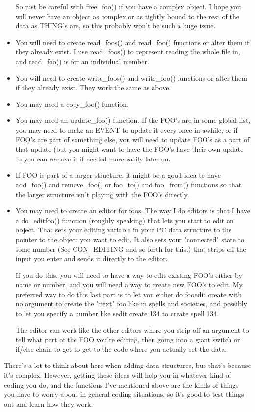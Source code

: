 \begin{itemize}
So just be careful with free\_foo() if you have a complex object.
I hope you will never have an object as complex or as tightly bound
to the rest of the data as THING's are, so this probably won't
be such a huge issue.

\item You will need to create read\_foos() and read\_foo() functions
or alter them if they already exist. I use read\_foos() to represent
reading the whole file in, and read\_foo() is for an individual
member.

\item You will need to create write\_foos() and write\_foo() functions
or alter them if they already exist. They work the same as above.

\item You may need a copy\_foo() function.

\item You may need an update\_foo() function. If the FOO's are in 
some global list, you may need to make an EVENT to update it
every once in awhile, or if FOO's are part of something else,
you will need to update FOO's as a part of that update (but
you might want to have the FOO's have their own update so you
can remove it if needed more easily later on.

\item If FOO is part of a larger structure, it might be a good idea
to have add\_foo() and remove\_foo() or foo\_to() and foo\_from() 
functions so that the larger structure isn't playing with the
FOO's directly. 

\item You may need to create an editor for foos. The way I do
editors is that I have a do\_editfoo() function (roughly speaking)
that lets you start to edit an object. That sets your editing
variable in your PC data structure to the pointer to the object
you want to edit. It also sets your "connected" state to some
number (See CON\_EDITING and so forth for this.) that strips
off the input you enter and sends it directly to the editor.

If you do this, you will need to have a way to edit existing
FOO's either by name or number, and  you will need a way to
create new FOO's to edit. My preferred way to do this last part is
to let you either do fooedit create with no argument to create
the "next" foo like in spells and societies, and possibly to let you
specify a number like sedit create 134 to create spell 134.


The editor can work like the other editors where you strip off
an argument to tell what part of the FOO you're editing, then
going into a giant switch or if/else chain to get to get to the
code where you actually set the data.

\end{itemize}

There's a lot to think about here when adding data structures, 
but that's because it's complex. However, getting these ideas
will help you in whatever kind of coding you do, and the
functions I've mentioned above are the kinds of things you have
to worry about in general coding situations, so it's good to
test things out and learn how they work.
